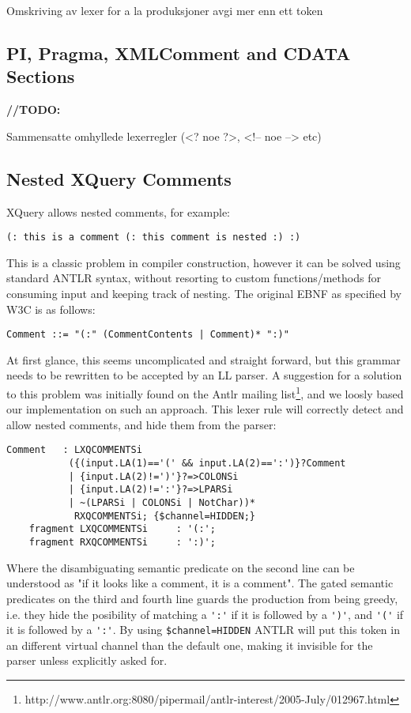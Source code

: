Omskriving av lexer for a la produksjoner avgi mer enn ett token

\subsection{PI, Pragma, XMLComment and CDATA Sections}
\textbf{\LARGE //TODO:} 

Sammensatte omhyllede lexerregler (<? noe ?>, <!-- noe --> etc)

\subsection{Nested XQuery Comments}
XQuery allows nested comments, for example:
\begin{verbatim}
(: this is a comment (: this comment is nested :) :)
\end{verbatim}
This is a classic problem in compiler construction, however it can be solved using standard ANTLR syntax, without resorting to custom functions/methods for consuming input and keeping track of nesting. The original EBNF as specified by W3C is as follows:
\begin{verbatim}
Comment ::= "(:" (CommentContents | Comment)* ":)"
\end{verbatim}
At first glance, this seems uncomplicated and straight forward, but this grammar needs to be rewritten to be accepted by an LL parser. A suggestion for a solution to this problem was initially found on the Antlr mailing list\footnote{http://www.antlr.org:8080/pipermail/antlr-interest/2005-July/012967.html}, and we loosly based our implementation on such an approach. This lexer rule will correctly detect and allow nested comments, and hide them from the parser:
\begin{verbatim}   
Comment   : LXQCOMMENTSi 
           ({(input.LA(1)=='(' && input.LA(2)==':')}?Comment 
           | {input.LA(2)!=')'}?=>COLONSi
           | {input.LA(2)!=':'}?=>LPARSi
           | ~(LPARSi | COLONSi | NotChar))*
            RXQCOMMENTSi; {$channel=HIDDEN;}
    fragment LXQCOMMENTSi     : '(:';
    fragment RXQCOMMENTSi     : ':)';
\end{verbatim}
Where the disambiguating semantic predicate on the second line can be understood as "if it looks like a comment, it is a comment". The gated semantic predicates on the third and fourth line guards the production from being greedy, i.e. they hide the posibility of matching a \verb!':'! if it is followed by a \verb!')'!, and \verb!'('! if it is followed by a \verb!':'!. By using \verb!$channel=HIDDEN! ANTLR will put this token in an different virtual channel than the default one, making it invisible for the parser unless explicitly asked for. 

